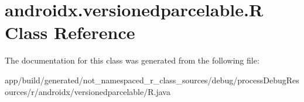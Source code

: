 \hypertarget{classandroidx_1_1versionedparcelable_1_1_r}{}\section{androidx.\+versionedparcelable.\+R Class Reference}
\label{classandroidx_1_1versionedparcelable_1_1_r}


The documentation for this class was generated from the following file\+:\begin{DoxyCompactItemize}
\item 
app/build/generated/not\+\_\+namespaced\+\_\+r\+\_\+class\+\_\+sources/debug/process\+Debug\+Resources/r/androidx/versionedparcelable/R.\+java\end{DoxyCompactItemize}
